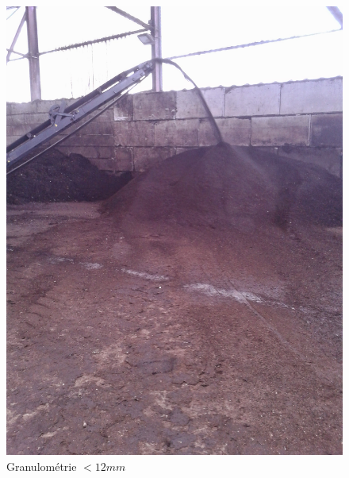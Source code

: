 \begin{figure}
  \centering
  \includegraphics[scale=0.07]{task7/tenneville/IMG_20141105_103027.jpg}
  \caption{Granulométrie $< \unit{12}{mm}$}
  \label{fig:Granu12}
\end{figure}
